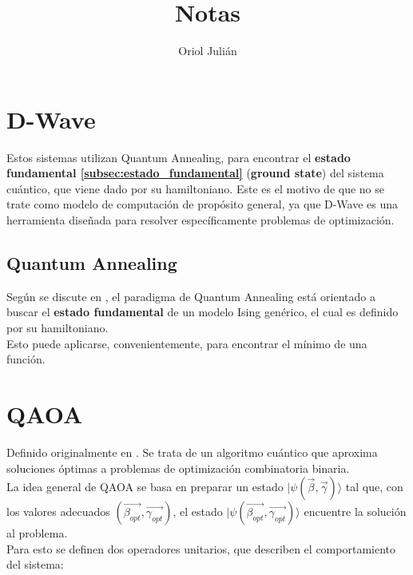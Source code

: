 \documentclass{article}
\title{Notas}
\author{Oriol Julián}
\begin{document}
\maketitle{}
\tableofcontents{}

\newpage
\section{D-Wave}
\label{sec:dwave}

Estos sistemas utilizan Quantum Annealing, para encontrar el \textbf{estado fundamental \ref{subsec:estado_fundamental}} (\textbf{ground state}) del sistema cuántico, que viene dado por su hamiltoniano.
Este es el motivo de que no se trate como modelo de computación de propósito general, ya que D-Wave es una herramienta diseñada para resolver específicamente problemas de optimización.

\subsection{Quantum Annealing}
\label{sec:quantum_annealing}

Según se discute en \cite{quantum_annealing}, el paradigma de Quantum Annealing está orientado a buscar el \textbf{estado fundamental} de un modelo Ising genérico, el cual es definido por su hamiltoniano.
\\ Esto puede aplicarse, convenientemente, para encontrar el mínimo de una función.

\newpage
\section{QAOA}
\label{sec:qaoa}

Definido originalmente en \cite{qaoa_paper_original}. Se trata de un algoritmo cuántico que aproxima soluciones óptimas a problemas de optimización combinatoria binaria.
\\ La idea general de QAOA se basa en preparar un estado \(\lvert\psi(\vec{\beta}, \vec{\gamma})\rangle\) tal que, con los valores adecuados \( (\vec{\beta_{opt}}, \vec{\gamma_{opt}}) \), el estado \(\lvert\psi(\vec{\beta_{opt}}, \vec{\gamma_{opt}})\rangle\) encuentre la solución al problema.
\\ Para esto se definen dos operadores unitarios, que describen el comportamiento del sistema:
\end{document}
